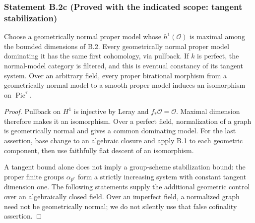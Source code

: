\subsubsection*{Statement B.2c (Proved with the indicated scope: tangent stabilization)}
Choose a geometrically normal proper model whose $h^1(\mathcal O)$
is maximal among the bounded dimensions of B.2.  Every geometrically
normal proper model dominating it has the same first cohomology,
via pullback.  If $k$ is perfect, the normal-model category is
filtered, and this is eventual constancy of its tangent system.
Over an arbitrary field, every proper birational morphism from a
geometrically normal model to a smooth proper model induces an
isomorphism on $\operatorname{Pic}^{\tau}$.
\begin{proof}
Pullback on $H^1$ is injective by Leray and $f_*\mathcal O=\mathcal O$.
Maximal dimension therefore makes it an isomorphism.  Over a perfect
field, normalization of a graph is geometrically normal and gives a
common dominating model.  For the last assertion, base change to an
algebraic closure and apply B.1 to each geometric component, then
use faithfully flat descent of an isomorphism.

A tangent bound alone does not imply a group-scheme stabilization
bound: the proper finite groups $\alpha_{p^r}$ form a strictly
increasing system with constant tangent dimension one.  The following
statements supply the additional geometric control over an
algebraically closed field.  Over an imperfect field, a normalized
graph need not be geometrically normal; we do not silently use that
false cofinality assertion.
\end{proof}

